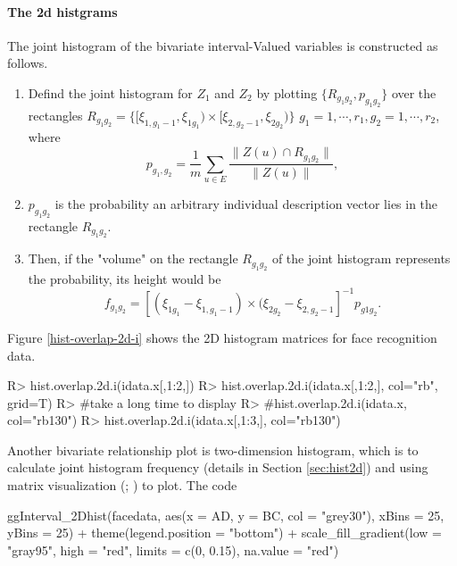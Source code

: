\documentclass[article]{jss}
\begin{document}
\paragraph{The 2d histgrams}
The joint histogram of the bivariate interval-Valued variables is constructed 
as follows.
\begin{enumerate}
\item
Defind the joint histogram for $Z_1$ and $Z_2$ by plotting $\{R_{g_1 g_2}, 
p_{g_1 g_2}\}$ over the rectangles $R_{g_1 g_2} = \{[\xi_{1, g_1 -1}, 
\xi_{1g_1})\times [\xi_{2, g_2-1}, \xi_{2g_2})\}$
$g_1 =1, \cdots, r_1, g_2 = 1, \cdots, r_2$, where
\[ 
p_{g_1, g_2} =
\frac{1}{m}\sum_{u \in E}\frac{\|Z(u)\cap R_{g_1 g_2}\|}{\|Z(u)\|},
\]
\item
$p_{g_1 g_2}$ is the probability an arbitrary individual description vector 
lies in the rectangle $R_{g_1 g_2}$. 
\item
Then, if the "volume" on
the rectangle $R_{g_1 g_2}$ of the joint histogram represents the probability, 
its height would be
\[
f_{g_1 g_2} = [(\xi_{1g_1}-\xi_{1,g_1 -1})\times (\xi_{2g_2}- \xi_{2,g_2 
-1}]^{-1}
p_{g1 g_2}.
\]
\end{enumerate}
Figure \ref{hist-overlap-2d-i} shows the 2D histogram matrices for face 
recognition data.
\begin{CodeChunk}
\begin{CodeInput}
R> hist.overlap.2d.i(idata.x[,1:2,])    
R> hist.overlap.2d.i(idata.x[,1:2,], col="rb", grid=T)    
R> #take a long time to display
R> #hist.overlap.2d.i(idata.x, col="rb130")
R> hist.overlap.2d.i(idata.x[,1:3,], col="rb130")   
\end{CodeInput}
\end{CodeChunk}


Another bivariate relationship plot is two-dimension histogram, which is to calculate joint histogram frequency (details in Section \ref{sec:hist2d}) and using matrix visualization (\cite{chen2002generalized}; \cite{chen2004matrix}) to plot. The code

\begin{CodeChunk}
\begin{CodeInput}
ggInterval_2Dhist(facedata, aes(x = AD, y = BC, col = "grey30"),
                  xBins = 25, yBins = 25) +
  theme(legend.position = "bottom") +
  scale_fill_gradient(low = "gray95", high = "red", limits = c(0, 0.15),
                      na.value = "red")
\end{CodeInput}
\end{CodeChunk}
\end{document}
